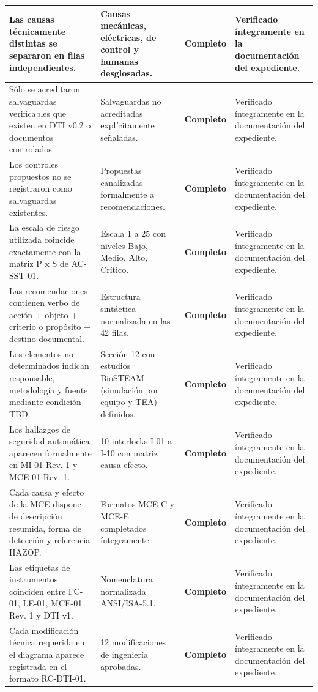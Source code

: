 \documentclass[10pt,letterpaper]{article}
\begin{document}
\begin{xltabular}{\textwidth}{|p{4.8cm}|p{2.6cm}|c|>{\raggedright\arraybackslash}X|}
Las causas técnicamente distintas se separaron en filas independientes. & Causas mecánicas, eléctricas, de control y humanas desglosadas. & \textbf{Completo} & Verificado íntegramente en la documentación del expediente. \\ \hline
Sólo se acreditaron salvaguardas verificables que existen en DTI v0.2 o documentos controlados. & Salvaguardas no acreditadas explícitamente señaladas. & \textbf{Completo} & Verificado íntegramente en la documentación del expediente. \\ \hline
Los controles propuestos no se registraron como salvaguardas existentes. & Propuestas canalizadas formalmente a recomendaciones. & \textbf{Completo} & Verificado íntegramente en la documentación del expediente. \\ \hline
La escala de riesgo utilizada coincide exactamente con la matriz P x S de AC-SST-01. & Escala 1 a 25 con niveles Bajo, Medio, Alto, Crítico. & \textbf{Completo} & Verificado íntegramente en la documentación del expediente. \\ \hline
Las recomendaciones contienen verbo de acción + objeto + criterio o propósito + destino documental. & Estructura sintáctica normalizada en las 42 filas. & \textbf{Completo} & Verificado íntegramente en la documentación del expediente. \\ \hline
Los elementos no determinados indican responsable, metodología y fuente mediante condición TBD. & Sección 12 con estudios BioSTEAM (simulación por equipo y TEA) definidos. & \textbf{Completo} & Verificado íntegramente en la documentación del expediente. \\ \hline
Los hallazgos de seguridad automática aparecen formalmente en MI-01 Rev. 1 y MCE-01 Rev. 1. & 10 interlocks I-01 a I-10 con matriz causa-efecto. & \textbf{Completo} & Verificado íntegramente en la documentación del expediente. \\ \hline
Cada causa y efecto de la MCE dispone de descripción resumida, forma de detección y referencia HAZOP. & Formatos MCE-C y MCE-E completados íntegramente. & \textbf{Completo} & Verificado íntegramente en la documentación del expediente. \\ \hline
Las etiquetas de instrumentos coinciden entre FC-01, LE-01, MCE-01 Rev. 1 y DTI v1. & Nomenclatura normalizada ANSI/ISA-5.1. & \textbf{Completo} & Verificado íntegramente en la documentación del expediente. \\ \hline
Cada modificación técnica requerida en el diagrama aparece registrada en el formato RC-DTI-01. & 12 modificaciones de ingeniería aprobadas. & \textbf{Completo} & Verificado íntegramente en la documentación del expediente. \\ \hline

\end{xltabular}
\end{document}
